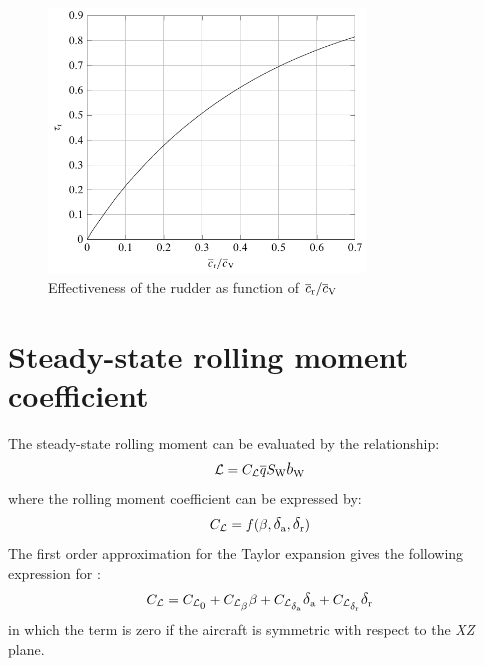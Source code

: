 \begin{figure}[htbp] 
\centering
\includegraphics[width=0.75\textwidth]{Immagini/Capitolo2/4_26-Effectiveness_Rudder}
\caption[Effectiveness of the rudder] {Effectiveness of the rudder \taurud as function of $\overline c_\text r/\overline c_\text V$}
\label{taurudder}
\end{figure}

\newpage
\section{Steady-state rolling moment coefficient}
\label{sec2.2}

The steady-state rolling moment can be evaluated by the relationship:
\begin{equation}
\label{eq:RollMoment}
\mathcal{L} = \CL \overline{q} \SW \bW
\end{equation}
where the rolling moment coefficient can be expressed by:
\begin{equation}
\CL = f(\beta,\deltaA,\deltaR)
\end{equation}
The first order approximation for the Taylor expansion gives the following expression for \CL:
\begin{equation}
\CL = \CLzeroRoll + \CLbeta \beta + \CLdeltaa \deltaA + \CLdeltar \deltaR
\end{equation}
in which the term \CLzeroRoll is zero if the aircraft is symmetric with respect to the \emph{XZ} plane.

